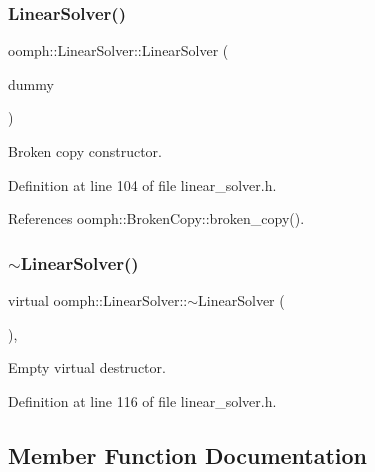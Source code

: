\subsubsection{\texorpdfstring{Linear\+Solver()}{LinearSolver()}\hspace{0.1cm}{\footnotesize\ttfamily [2/2]}}
{\footnotesize\ttfamily oomph\+::\+Linear\+Solver\+::\+Linear\+Solver (\begin{DoxyParamCaption}\item[{const \hyperlink{classoomph_1_1LinearSolver}{Linear\+Solver} \&}]{dummy }\end{DoxyParamCaption})\hspace{0.3cm}{\ttfamily [inline]}}



Broken copy constructor. 



Definition at line 104 of file linear\+\_\+solver.\+h.



References oomph\+::\+Broken\+Copy\+::broken\+\_\+copy().

\mbox{\label{classoomph_1_1LinearSolver_a9cc9b2c9a239777c4f9b15f26bb324a0}} 
\subsubsection{\texorpdfstring{$\sim$\+Linear\+Solver()}{~LinearSolver()}}
{\footnotesize\ttfamily virtual oomph\+::\+Linear\+Solver\+::$\sim$\+Linear\+Solver (\begin{DoxyParamCaption}{ }\end{DoxyParamCaption})\hspace{0.3cm}{\ttfamily [inline]}, {\ttfamily [virtual]}}



Empty virtual destructor. 



Definition at line 116 of file linear\+\_\+solver.\+h.



\subsection{Member Function Documentation}
\mbox{\label{classoomph_1_1LinearSolver_a9d66f3262e80ca06a365f98216afd85f}} 
